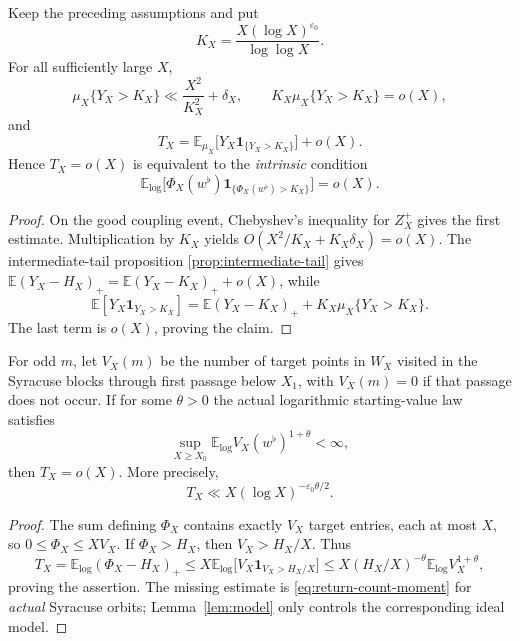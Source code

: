 \begin{corollary}
\label{cor:intrinsic-exceptional-mass}
Keep the preceding assumptions and put
\[
 K_X=\frac{X(\log X)^{\varepsilon_0}}{\log\log X}.
\]
For all sufficiently large $X$,
\[
 \mu_X\{Y_X>K_X\}\ll\frac{X^2}{K_X^2}+\delta_X,
 \qquad K_X\mu_X\{Y_X>K_X\}=o(X),
\]
and
\begin{equation}\label{eq:intrinsic-exceptional-mass}
 \boxed{T_X=\mathbb E_{\mu_X}
 \bigl[Y_X\mathbf1_{\{Y_X>K_X\}}\bigr]+o(X).}
\end{equation}
Hence $T_X=o(X)$ is equivalent to the \emph{intrinsic} condition
\[
 \mathbb E_{\log}\bigl[
 \Phi_X(w^\flat)\mathbf1_{\{\Phi_X(w^\flat)>K_X\}}
 \bigr]=o(X).
\]
\end{corollary}
\begin{proof}
On the good coupling event, Chebyshev's inequality for $Z_X^+$
gives the first estimate. Multiplication by $K_X$ yields
$O(X^2/K_X+K_X\delta_X)=o(X)$.
The intermediate-tail proposition
\ref{prop:intermediate-tail} gives
$\mathbb E(Y_X-H_X)_+
 =\mathbb E(Y_X-K_X)_++o(X)$, while
\[
 \mathbb E[Y_X\mathbf1_{Y_X>K_X}]
 =\mathbb E(Y_X-K_X)_++K_X\mu_X\{Y_X>K_X\}.
\]
The last term is $o(X)$, proving the claim.
\end{proof}

\begin{corollary}
\label{cor:return-count}
For odd $m$, let $V_X(m)$ be the number of target points in $W_X$
visited in the Syracuse blocks through first passage below $X_1$,
with $V_X(m)=0$ if that passage does not occur. If for some
$\theta>0$ the actual logarithmic starting-value law satisfies
\begin{equation}\label{eq:return-count-moment}
 \sup_{X\ge X_0}\mathbb E_{\log}
     V_X(w^\flat)^{1+\theta}<\infty,
\end{equation}
then $T_X=o(X)$. More precisely,
\[
 T_X\ll X(\log X)^{-\varepsilon_0\theta/2}.
\]
\end{corollary}
\begin{proof}
The sum defining $\Phi_X$ contains exactly $V_X$ target entries,
each at most $X$, so $0\le\Phi_X\le XV_X$. If
$\Phi_X>H_X$, then $V_X>H_X/X$. Thus
\[
 T_X=\mathbb E_{\log}(\Phi_X-H_X)_+
 \le X\mathbb E_{\log}\bigl[V_X\mathbf1_{V_X>H_X/X}\bigr]
 \le X(H_X/X)^{-\theta}\mathbb E_{\log}V_X^{1+\theta},
\]
proving the assertion. The missing estimate is
\eqref{eq:return-count-moment} for \emph{actual} Syracuse orbits;
Lemma~\ref{lem:model} only controls the corresponding ideal model.
\end{proof}

